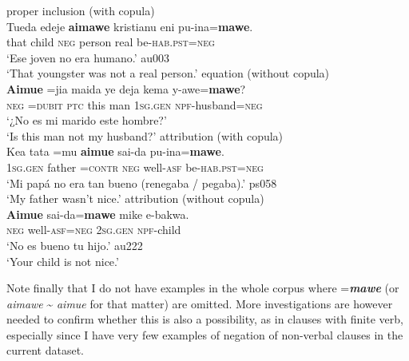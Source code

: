 \documentclass[output=paper]{langsci/langscibook}
\begin{document}
\begin{exe}\ex
\label{ex:tacana-inhuman-husband} \begin{xlist}
\ex\label{ex:tacana-inhuman}
proper inclusion (with copula)\\
\gll {}Tueda  edeje{\cb} \textbf{aimawe}  kristianu eni{\cb} pu-ina=\textbf{mawe}.\\
 that  child  \textsc{neg}  person  real  be-\textsc{hab.pst=neg}\\
\glt `Ese joven no era humano.' au003\\
`That youngster was not a real person.'
\ex\label{ex:tacana-husband}
equation (without copula)\\
\gll  \textbf{Aimue}  =jia  maida ye  deja{\cb} kema y-awe{\cb}=\textbf{mawe}?\\
 \textsc{neg}  =\textsc{dubit}  \textsc{ptc}  this  man  \textsc{1sg.gen}
 \textsc{npf}-husband=\textsc{neg}\\
\glt `¿No es mi marido este hombre?'
\parencite[4]{Ottaviano1989}\\
`Is this man not my husband?' 
\ex\label{ex:tacana-nice}  attribution (with copula)\\
\gll {}Kea tata{\cb} =mu \textbf{aimue} sai-da pu-ina=\textbf{mawe}.\\
    \textsc{1sg.gen}  father  =\textsc{contr}  \textsc{neg}
    well\textsc{-asf}  be-\textsc{hab.pst=neg}\\
\glt `Mi papá no era tan bueno (renegaba \slash{}  pegaba).' ps058\\
`My father wasn't nice.' 
 \ex\label{ex:tacana-child}  attribution (without copula)\\
\gll 
    \textbf{Aimue} sai-da=\textbf{mawe} mike e-bakwa{\cb}.\\
    \textsc{neg}  well-\textsc{asf=neg}  \textsc{2sg.gen}
    \textsc{npf}-child\\
\glt `No es bueno tu hijo.' au222\\
`Your child is not nice.' 
\end{xlist}\end{exe}

Note finally that I do not have examples in the whole corpus where
=\textbf{\textit{mawe}} (or \textit{aimawe} {\textasciitilde}
\textit{aimue} for that matter) are omitted. More investigations are
however needed to confirm whether this is also a possibility, as in clauses
with finite verb, especially since I have very few examples of negation of
non-verbal clauses in the current dataset.
\end{document}
